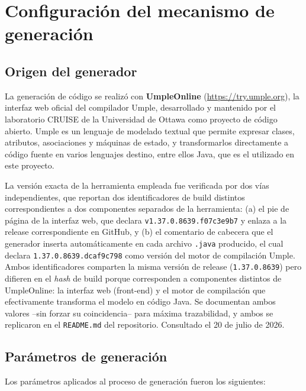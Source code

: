 \setcounter{section}{4}

\section{Configuración del mecanismo de generación}

\subsection{Origen del generador}

La generación de código se realizó con \textbf{UmpleOnline}
(\url{https://try.umple.org}), la interfaz web oficial del compilador
Umple, desarrollado y mantenido por el laboratorio CRUISE de la
Universidad de Ottawa como proyecto de código abierto. Umple es un
lenguaje de modelado textual que permite expresar clases, atributos,
asociaciones y máquinas de estado, y transformarlos directamente a
código fuente en varios lenguajes destino, entre ellos Java, que es el
utilizado en este proyecto.

La versión exacta de la herramienta empleada fue verificada por dos
vías independientes, que reportan dos identificadores de build
distintos correspondientes a dos componentes separados de la
herramienta: (a) el pie de página de la interfaz web, que declara
\texttt{v1.37.0.8639.f07c3e9b7} y enlaza a la release correspondiente
en GitHub, y (b) el comentario de cabecera que el generador inserta
automáticamente en cada archivo \texttt{.java} producido, el cual
declara \texttt{1.37.0.8639.dcaf9c798} como versión del motor de
compilación Umple. Ambos identificadores comparten la misma versión
de release (\texttt{1.37.0.8639}) pero difieren en el \emph{hash} de
build porque corresponden a componentes distintos de UmpleOnline: la
interfaz web (front-end) y el motor de compilación que efectivamente
transforma el modelo en código Java. Se documentan ambos valores
--sin forzar su coincidencia-- para máxima trazabilidad, y ambos se
replicaron en el \texttt{README.md} del repositorio. Consultado el 20
de julio de 2026.

\subsection{Parámetros de generación}

Los parámetros aplicados al proceso de generación fueron los
siguientes:

